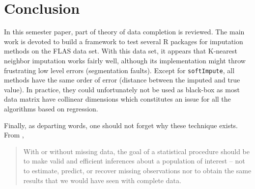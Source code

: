 \chapter{Conclusion}

In this semester paper, part of theory of data completion is reviewed. The main
work is devoted to build a framework to test several R packages for imputation
methods on the FLAS data set. With this data set, it appears that K-nearest
neighbor imputation works fairly well, although its implementation might throw
frustrating low level errors (segmentation faults). Except for
\texttt{softImpute}, all methods have the same order of error (distance between
the imputed and true value). In practice, they could unfortunately not be used
as black-box as most data matrix have collinear dimensions which constitutes an
issue for all the algorithms based on regression.

Finally, as departing words, one should not forget why these technique
exists. From \cite{schafer2002missing},

\begin{quote}
  With or without missing data, the goal of a statistical procedure should be
  to make valid and efficient inferences about a population of interest -- not to
  estimate, predict, or recover missing observations nor to obtain the same
  results that we would have seen with complete data.
\end{quote}



